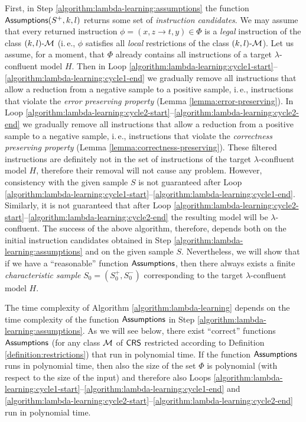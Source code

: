 First, in Step \ref{algorithm:lambda-learning:assumptions} the function \index{$\Assumptions$}$\textup{\sf Assumptions}(S^+, k, l)$ returns some set of \emph{instruction candidates}. We may assume that every returned instruction $\phi = (x, z \to t, y) \in \Phi$ is a \emph{legal} instruction of the class $\textup{\sf $(k,l)$-\textup{\sf $\mathcal{M}$}}$ (i.\,e., $\phi$ satisfies all \emph{local} restrictions of the class $\textup{\sf $(k,l)$-\textup{\sf $\mathcal{M}$}}$). Let us assume, for a moment, that $\Phi$ already contains all instructions of a target $\lambda$-confluent model $H$. Then in Loop \ref{algorithm:lambda-learning:cycle1-start}--\ref{algorithm:lambda-learning:cycle1-end} we gradually remove all instructions that allow a reduction from a negative sample to a positive sample, i.\,e., instructions that violate the \emph{error preserving property} (Lemma \ref{lemma:error-preserving}). In Loop \ref{algorithm:lambda-learning:cycle2-start}--\ref{algorithm:lambda-learning:cycle2-end} we gradually remove all instructions that allow a reduction from a positive sample to a negative sample, i.\,e., instructions that violate the \emph{correctness preserving property} (Lemma \ref{lemma:correctness-preserving}). These filtered instructions are definitely not in the set of instructions of the target $\lambda$-confluent model $H$, therefore their removal will not cause any problem. However, consistency with the given sample $S$ is not guaranteed after Loop \ref{algorithm:lambda-learning:cycle1-start}--\ref{algorithm:lambda-learning:cycle1-end}. Similarly, it is not guaranteed that after Loop \ref{algorithm:lambda-learning:cycle2-start}--\ref{algorithm:lambda-learning:cycle2-end} the resulting model will be $\lambda$-confluent. The success of the above algorithm, therefore, depends both on the initial instruction candidates obtained in Step \ref{algorithm:lambda-learning:assumptions} and on the given sample $S$. Nevertheless, we will show that if we have a ``reasonable'' function $\Assumptions$, then there always exists a finite \emph{characteristic sample} $S_0 = (S_0^+, S_0^-)$ corresponding to the target $\lambda$-confluent model $H$.

The time complexity of Algorithm \ref{algorithm:lambda-learning} depends on the time complexity of the function $\Assumptions$ in Step \ref{algorithm:lambda-learning:assumptions}. As we will see below, there exist ``correct'' functions $\Assumptions$ (for any class $\textup{\sf $\mathcal{M}$}$ of $\textup{\sf CRS\/}$ restricted according to Definition \ref{definition:restrictions}) that run in polynomial time. If the function $\Assumptions$ runs in polynomial time, then also the size of the set $\Phi$ is polynomial (with respect to the size of the input) and therefore also Loops \ref{algorithm:lambda-learning:cycle1-start}--\ref{algorithm:lambda-learning:cycle1-end} and \ref{algorithm:lambda-learning:cycle2-start}--\ref{algorithm:lambda-learning:cycle2-end} run in polynomial time.

